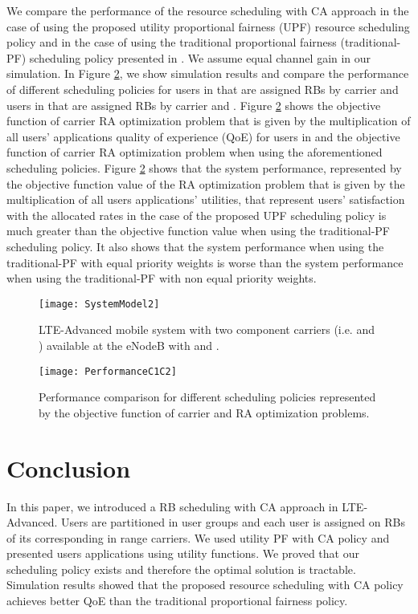 \documentclass[conference]{IEEEtran}
\begin{document}
We compare the performance of the resource scheduling with CA approach in the case of using the proposed utility proportional fairness (UPF) resource scheduling policy and in the case of using the traditional proportional fairness (traditional-PF) scheduling policy presented in \cite{SelfOrganizedLTE}. We assume equal channel gain in our simulation. In Figure \ref{fig:PerformanceC1C2}, we show simulation results and compare the performance of different scheduling policies for users in  that are assigned RBs by carrier  and users in  that are assigned RBs by carrier  and . Figure \ref{fig:PerformanceC1C2} shows the objective function of carrier  RA optimization problem that is given by the multiplication of all users' applications quality of experience (QoE) for users in  and the objective function of carrier  RA optimization problem when using the aforementioned scheduling policies. Figure \ref{fig:PerformanceC1C2} shows that the system performance, represented by the objective function value of the RA optimization problem that is given by the multiplication of all users applications' utilities, that represent users' satisfaction with the allocated rates in the case of the proposed UPF scheduling policy is much greater than the objective function value when using the traditional-PF scheduling policy. It also shows that the system performance when using the traditional-PF with equal priority weights is worse than the system performance when using the traditional-PF with non equal priority weights.
\begin{figure}
\centering
\vspace{-1em}
\texttt{[image: SystemModel2]}
\vspace{-1em}
\caption{LTE-Advanced mobile system with two component carriers (i.e.  and ) available at the eNodeB with  and .}
\vspace{-0.2em}
\label{fig:SystemModel2}
\end{figure}
\begin{figure}
\centering
\vspace{-1em}
\texttt{[image: PerformanceC1C2]}
\vspace{-1.5em}
\caption{Performance comparison for different scheduling policies represented by the objective function of carrier  and  RA optimization problems.}
\vspace{-1.2em}
\label{fig:PerformanceC1C2}
\end{figure}
\section{Conclusion}\label{sec:conclude}
In this paper, we introduced a RB scheduling with CA approach in LTE-Advanced. Users are partitioned in user groups and each user is assigned on RBs of its corresponding in range carriers. We used utility PF with CA policy and presented users applications using utility functions. We proved that our scheduling policy exists and therefore the optimal solution is tractable. Simulation results showed that the proposed resource scheduling with CA policy achieves better QoE than the traditional proportional fairness policy. 




\end{document}
